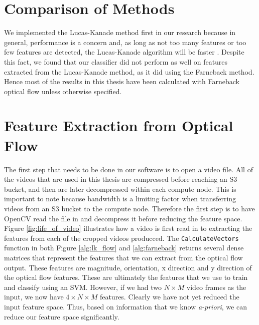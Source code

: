 \section{\label{section:comparison}Comparison of Methods}
We implemented the Lucas-Kanade method first in our research because in general,
performance is a concern and, as long as not too many features or
too few features are detected, the Lucas-Kanade algorithm will be faster
\cite{de2015choosing}. Despite this fact, we found that our classifier did
not perform as well on features extracted from the Lucas-Kanade method, as it
did using the Farneback method. Hence most of the results in this thesis
have been calculated with Farneback optical flow unless otherwise specified.

\section{\label{section:feature_extraction}Feature Extraction from Optical Flow}
The first step that needs to be done in our software is to open a video file.
All of the videos that are used in this thesis are compressed before reaching an
S3 bucket, and then are later decompressed  within each compute node. This is
important to note because bandwidth is a limiting factor when transferring
videos from an S3 bucket to the compute node.  Therefore the first step is to
have OpenCV read the file in and decompress it before  reducing the feature
space. Figure \ref{fig:life_of_video} illustrates how a video is first read in
to extracting the features from each of the cropped videos producced. The
\texttt{CalculateVectors} function in both Figure \ref{alg:lk_flow} and
\ref{alg:farneback} returns several dense matrices that represent the features
that we can extract from the optical flow output. These features are magnitude,
orientation, x direction and y direction of the optical flow features. These are
ultimately the features that we use to train and classify using an SVM. However,
if we had two $N \times M$ video frames as the input, we now have $4 \times N
\times M$ features. Clearly we have not yet reduced the input feature space.
Thus, based on information that we know \textit{a-priori}, we can reduce our
feature space significantly.

